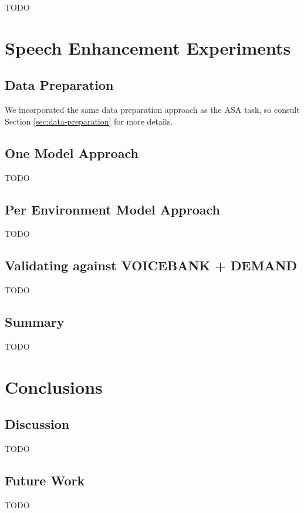 \documentclass[logo,bsc,singlespacing,parskip,online]{infthesis}
\begin{document}
TODO

\chapter{Speech Enhancement Experiments}
\section{Data Preparation}
We incorporated the same data preparation approach as the ASA task, so consult Section \ref{sec:data-preparation} for more details.
\section{One Model Approach}
TODO
\section{Per Environment Model Approach}
TODO
\section{Validating against VOICEBANK + DEMAND}
TODO
\section{Summary}
TODO

\chapter{Conclusions}
\section{Discussion}
TODO
\section{Future Work}
TODO










\end{document}
